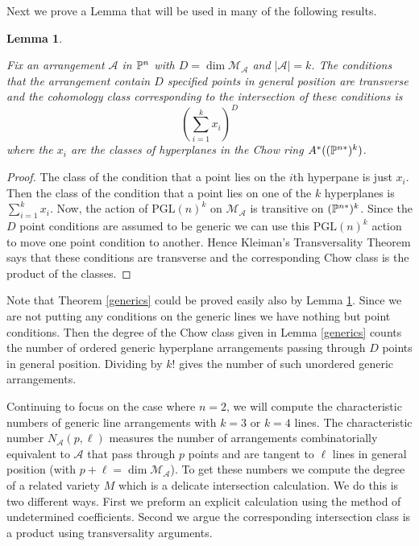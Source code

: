 \documentclass[12pt]{article}
\theoremstyle{plain}
\newtheorem{lemma}[theorem]{Lemma}
\theoremstyle{definition}
\newcommand{\A}{\mathcal{A}}
\newcommand{\M}{\mathcal{M}}
\renewcommand{\P}{\ensuremath \mathbb{P}}
\begin{document}
Next we prove a Lemma that will be used in many of the following results.

\begin{lemma}\label{transpts}

Fix an arrangement $\A$ in $\P^n$ with $D=\dim \M_\A$ and $|\A|=k$. The conditions that the arrangement contain $D$ specified points in general position are transverse and the cohomology class corresponding to the intersection of these conditions is$$\left(\sum_{i=1}^kx_i\right)^D$$ where the $x_i$ are the classes of hyperplanes in the Chow ring $A^* ((\P^{n*})^k)$.

\end{lemma}

\begin{proof} The class of the condition that a point lies on the $i$th hyperpane is just $x_i$. Then the class of the condition that a point lies on one of the $k$ hyperplanes is $\sum_{i=1}^kx_i$. Now, the action of $\mathrm{PGL}(n)^k$ on $\M_\A$ is transitive on $(\P^{n*})^k$. Since the $D$ point conditions are assumed to be generic we can use this $\mathrm{PGL}(n)^k$ action to move one point condition to another. Hence Kleiman's Transversality Theorem \cite{Kleiman} says that these conditions are transverse and the corresponding Chow class is the product of the classes. \end{proof}

Note that Theorem \ref{generics} could be proved easily also by Lemma \ref{transpts}. Since we are not putting any conditions on the generic lines we have nothing but point conditions. Then the degree of the Chow class given in Lemma \ref{generics} counts the number of ordered generic hyperplane arrangements passing through $D$ points in general position. Dividing by $k!$ gives the number of such unordered generic arrangements.

Continuing to focus on the case where $n=2$, we will compute the
characteristic numbers of generic line arrangements with $k=3$ or
$k=4$ lines.  The characteristic number $N_\A(p,\ell)$ measures the
number of arrangements combinatorially equivalent to $\A$ that
pass through $p$ points and are tangent to $\ell$ lines in general
position (with $p + \ell = \dim \M_\A$). To get these numbers we compute the degree of a related variety $M$ which is a delicate intersection calculation. We do this is two different ways. First we preform an explicit calculation using the method of undetermined coefficients. Second we argue the corresponding intersection class is a product using transversality arguments.
\end{document}
